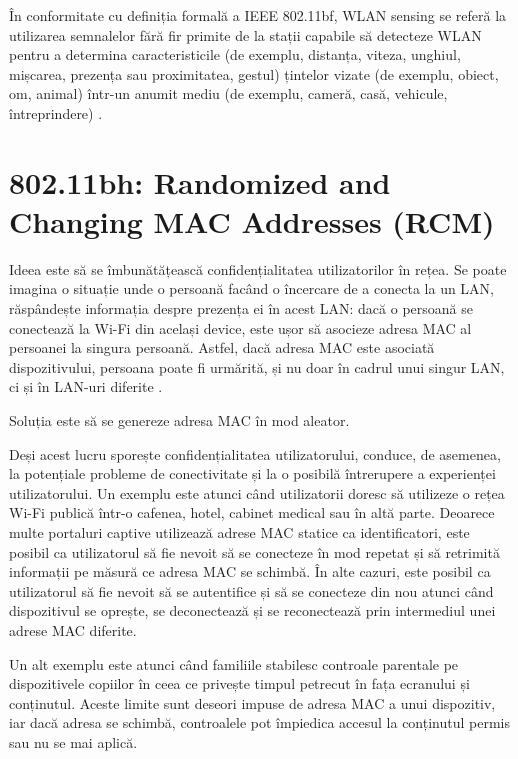 \documentclass[a4paper,12pt]{report}
\begin{document}
În conformitate cu definiția formală a \ac{IEEE} 802.11bf, \ac{WLAN} sensing se referă la utilizarea semnalelor fără fir primite de la stații capabile să detecteze \ac{WLAN} pentru a determina caracteristicile (de exemplu, distanța, viteza, unghiul, mișcarea, prezența sau proximitatea, gestul) țintelor vizate (de exemplu, obiect, om, animal) într-un anumit mediu (de exemplu, cameră, casă, vehicule, întreprindere) \cite{802_11bf}.

\section{802.11bh: Randomized and Changing \ac{MAC} Addresses (RCM)}

Ideea este să se îmbunătățească confidențialitatea utilizatorilor în rețea.
Se poate imagina o situație unde o persoană facând o încercare de a conecta la un \ac{LAN}, răspândește informația despre prezența ei în acest \ac{LAN}: dacă o persoană se conectează la \ac{Wi-Fi} din același device, este ușor să asocieze adresa \ac{MAC} al persoanei la singura persoană.
Astfel, dacă adresa \ac{MAC} este asociată dispozitivului, persoana poate fi urmărită, și nu doar în cadrul unui singur \ac{LAN}, ci și în \ac{LAN}-uri diferite \cite{802_11bh_youtube}. 

Soluția este să se genereze adresa \ac{MAC} în mod aleator.

Deși acest lucru sporește confidențialitatea utilizatorului, conduce, de asemenea, la potențiale probleme de conectivitate și la o posibilă întrerupere a experienței utilizatorului.
Un exemplu este atunci când utilizatorii doresc să utilizeze o rețea \ac{Wi-Fi} publică într-o cafenea, hotel, cabinet medical sau în altă parte.
Deoarece multe portaluri captive utilizează adrese \ac{MAC} statice ca identificatori, este posibil ca utilizatorul să fie nevoit să se conecteze în mod repetat și să retrimită informații pe măsură ce adresa \ac{MAC} se schimbă.
În alte cazuri, este posibil ca utilizatorul să fie nevoit să se autentifice și să se conecteze din nou atunci când dispozitivul se oprește, se deconectează și se reconectează prin intermediul unei adrese \ac{MAC} diferite.

Un alt exemplu este atunci când familiile stabilesc controale parentale pe dispozitivele copiilor în ceea ce privește timpul petrecut în fața ecranului și conținutul.
Aceste limite sunt deseori impuse de adresa \ac{MAC} a unui dispozitiv, iar dacă adresa se schimbă, controalele pot împiedica accesul la conținutul permis sau nu se mai aplică.
\end{document}
